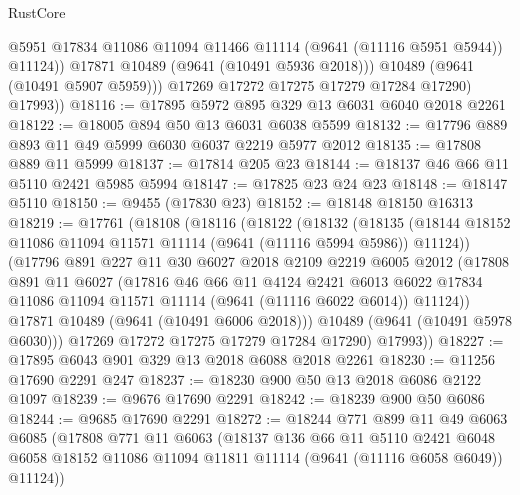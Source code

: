 \begin{lexlean}{RustCore}
\begin{coremodule}
                  @5951
                  @17834
                  @11086
                  @11094
                  @11466
                  @11114
                  (@9641 (@11116 @5951 @5944))
                  @11124))
              @17871
              @10489
              (@9641 (@10491 @5936 @2018)))
            @10489
            (@9641 (@10491 @5907 @5959)))
          @17269
          @17272
          @17275
          @17279
          @17284
          @17290)
        @17993))
@18116 := @17895 @5972 @895 @329 @13 @6031 @6040 @2018 @2261
@18122 := @18005 @894 @50 @13 @6031 @6038 @5599
@18132 := @17796 @889 @893 @11 @49 @5999 @6030 @6037 @2219 @5977 @2012
@18135 := @17808 @889 @11 @5999
@18137 := @17814 @205 @23
@18144 := @18137 @46 @66 @11 @5110 @2421 @5985 @5994
@18147 := @17825 @23 @24 @23
@18148 := @18147 @5110
@18150 := @9455 (@17830 @23)
@18152 := @18148 @18150 @16313
@18219 := @17761
    (@18108
      (@18116
        (@18122
          (@18132
            (@18135 (@18144 @18152 @11086 @11094 @11571 @11114 (@9641 (@11116 @5994 @5986)) @11124))
            (@17796
              @891
              @227
              @11
              @30
              @6027
              @2018
              @2109
              @2219
              @6005
              @2012
              (@17808
                @891
                @11
                @6027
                (@17816
                  @46
                  @66
                  @11
                  @4124
                  @2421
                  @6013
                  @6022
                  @17834
                  @11086
                  @11094
                  @11571
                  @11114
                  (@9641 (@11116 @6022 @6014))
                  @11124))
              @17871
              @10489
              (@9641 (@10491 @6006 @2018)))
            @10489
            (@9641 (@10491 @5978 @6030)))
          @17269
          @17272
          @17275
          @17279
          @17284
          @17290)
        @17993))
@18227 := @17895 @6043 @901 @329 @13 @2018 @6088 @2018 @2261
@18230 := @11256 @17690 @2291 @247
@18237 := @18230 @900 @50 @13 @2018 @6086 @2122 @1097
@18239 := @9676 @17690 @2291
@18242 := @18239 @900 @50 @6086
@18244 := @9685 @17690 @2291
@18272 := @18244
    @771
    @899
    @11
    @49
    @6063
    @6085
    (@17808
      @771
      @11
      @6063
      (@18137
        @136
        @66
        @11
        @5110
        @2421
        @6048
        @6058
        @18152
        @11086
        @11094
        @11811
        @11114
        (@9641 (@11116 @6058 @6049))
        @11124))

\end{coremodule}
\end{lexlean}

